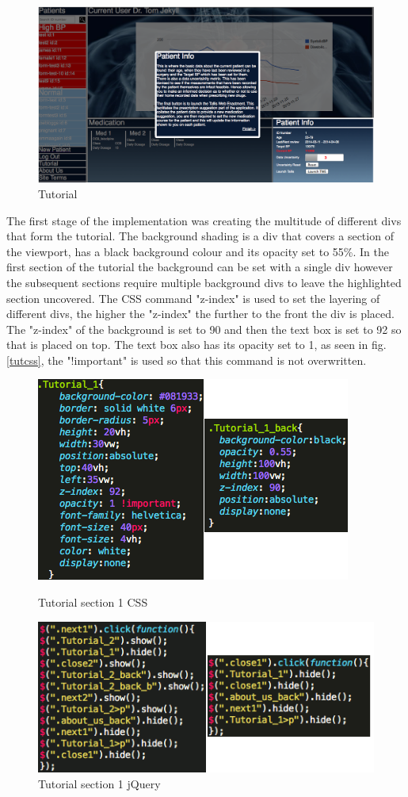 \documentclass[11pt]{article}
\begin{document}
\begin{figure}[h!]
\includegraphics[width=0.8\linewidth]{tutorial6.png}
\endminipage
\caption{Tutorial \label{tut}}
\end{figure} 
The first stage of the implementation was creating the multitude of different divs that form the tutorial. The background shading is a div that covers a section of the viewport, has a black background colour and its opacity set to 55\%. In the first section of the tutorial the background can be set with a single div however the subsequent sections require multiple background divs to leave the highlighted section uncovered. The CSS command "z-index" is used to set the layering of different divs, the higher the "z-index" the further to the front the div is placed. The "z-index" of the background is set to 90 and then the text box is set to 92 so that is placed on top. The text box also has its opacity set to 1, as seen in fig.\ref{tutcss}, the "!important" is used so that this command is not overwritten.
\begin{figure}
\centering
\includegraphics[scale=0.4]{tutorialCSS.png}
\caption{Tutorial section 1 CSS \label{tutcss}} 
\includegraphics[scale=0.4]{tutorial1jQuery.png}
\caption{Tutorial section 1 jQuery \label{tutjq}} 
\end{figure}
\end{document}
